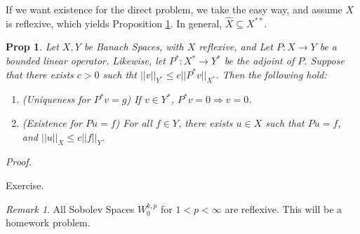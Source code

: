 \documentclass[letterpaper,10pt]{article}
\newcommand{\wkp}{W^{k,p}}
\theoremstyle{definition}
\theoremstyle{remark}
\newtheorem*{rmk}{Remark}
\theoremstyle{plain}
\newtheorem{prop}[thm]{Prop}
\newenvironment{proofm}{
    \vspace{5pt}
    \begin{mdframed}[
        bottomline=false,topline=false,rightline=false, linecolor=red,linewidth=2pt, skipabove=0
    ]
    \noindent\textit{Proof.}
}{
    \hspace{\fill}\qedsymbol\end{mdframed}
}
\begin{document}
If we want existence for the direct problem, we take the easy way, and assume $X$
is reflexive, which yields Proposition \ref{prop:dual2}.
In general, $\hat X\subseteq X^{**}$.
\begin{prop}\label{prop:dual2}
    Let $X,Y$ be Banach Spaces, with $X$ reflexive, 
    and Let $P:X\rightarrow Y$ be a bounded linear operator.
    Likewise, let $P^*:X^*\rightarrow Y^*$ be the adjoint of $P$.
    Suppose that there exists $c>0$ such tht $||v||_{Y^*}\leq c||P^*v||_{X^*}$.
    Then the following hold:
    \begin{enumerate}[label=\roman*.]
        \item (Uniqueness for $P^*v=g$) If $v\in Y^*$, $P^*v=0\Rightarrow v=0$.
        \item (Existence for $Pu=f$) For all $f\in Y$, there exists 
            $u\in X$ such that $Pu=f$, and $||u||_{X}\leq c||f||_{Y}$.
    \end{enumerate}
\end{prop}
\begin{proofm}
    Exercise.
\end{proofm}

\begin{rmk}
    All Sobolev Spaces $\wkp_0$ for $1<p<\infty$ are reflexive. This will be a
    homework problem.
\end{rmk}
\end{document}
